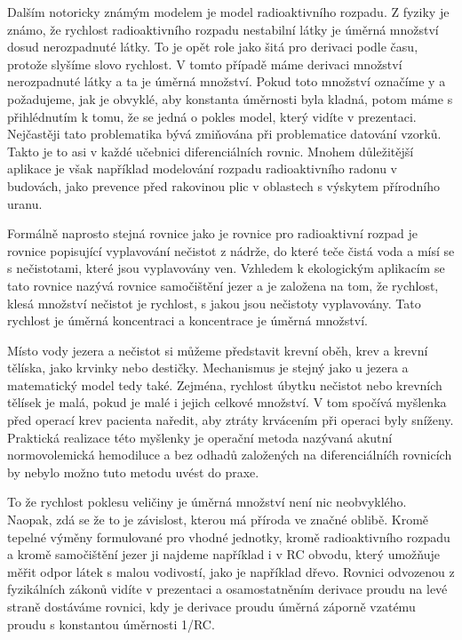 Dalším notoricky známým modelem je model radioaktivního rozpadu. Z fyziky je známo, že rychlost radioaktivního rozpadu nestabilní látky je úměrná množství dosud nerozpadnuté látky. To je opět role jako šitá pro derivaci podle času, protože slyšíme slovo rychlost. V tomto případě máme derivaci množství nerozpadnuté látky a ta je úměrná množství. Pokud toto množství označíme y a požadujeme, jak je obvyklé, aby konstanta úměrnosti byla kladná, potom máme s přihlédnutím k tomu, že se jedná o pokles model, který vidíte v prezentaci. Nejčastěji tato problematika bývá zmiňována při problematice datování vzorků. Takto je to asi v každé učebnici diferenciálních rovnic. Mnohem důležitější aplikace je však například modelování rozpadu radioaktivního radonu v budovách, jako prevence před rakovinou plic v oblastech s výskytem přírodního uranu.

Formálně naprosto stejná rovnice jako je rovnice pro radioaktivní rozpad je rovnice popisující vyplavování nečistot z nádrže, do které teče čistá voda a mísí se s nečistotami, které jsou vyplavovány ven. Vzhledem k ekologickým aplikacím se tato rovnice nazývá rovnice samočištění jezer a je založena na tom, že rychlost, klesá množství nečistot je rychlost, s jakou jsou nečistoty vyplavovány. Tato rychlost je úměrná koncentraci a koncentrace je úměrná množství.

Místo vody jezera a nečistot si můžeme představit krevní oběh, krev a krevní tělíska, jako krvinky nebo destičky. Mechanismus je stejný jako u jezera a matematický model tedy také. Zejména, rychlost úbytku nečistot nebo krevních tělísek je malá, pokud je malé i jejich celkové množství. V tom spočívá myšlenka před operací krev pacienta naředit, aby ztráty krvácením při operaci byly sníženy. Praktická realizace této myšlenky je operační metoda nazývaná akutní normovolemická hemodiluce a bez odhadů založených na diferenciálníćh rovnicích by nebylo možno tuto metodu uvést do praxe.

To že rychlost poklesu veličiny je úměrná množství není nic neobvyklého. Naopak, zdá se že to je závislost, kterou má příroda ve značné oblibě. Kromě tepelné výměny formulované pro vhodné jednotky, kromě radioaktivního rozpadu a kromě samočištění jezer ji najdeme například i v RC obvodu, který umožňuje měřit odpor látek s malou vodivostí, jako je například dřevo. Rovnici odvozenou z fyzikálních zákonů vidíte v prezentaci a osamostatněním derivace proudu na levé straně dostáváme rovnici, kdy je derivace proudu úměrná záporně vzatému proudu s konstantou úměrnosti 1/RC.

